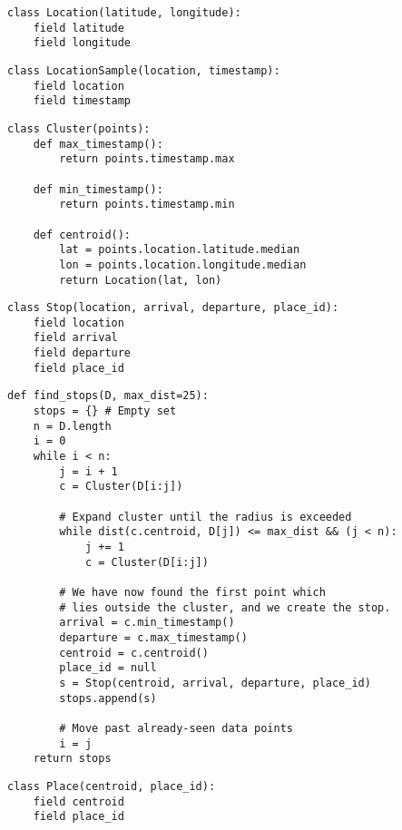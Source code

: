 
\begin{verbatim}
class Location(latitude, longitude):
    field latitude
    field longitude
\end{verbatim}

\begin{verbatim}
class LocationSample(location, timestamp):
    field location
    field timestamp
\end{verbatim}


\begin{verbatim}
class Cluster(points):
    def max_timestamp():
        return points.timestamp.max
        
    def min_timestamp():
        return points.timestamp.min
        
    def centroid():
        lat = points.location.latitude.median
        lon = points.location.longitude.median
        return Location(lat, lon)
\end{verbatim}

\begin{verbatim}
class Stop(location, arrival, departure, place_id):
    field location
    field arrival
    field departure
    field place_id
\end{verbatim}

\begin{verbatim}
def find_stops(D, max_dist=25):
    stops = {} # Empty set
    n = D.length
    i = 0
    while i < n:
        j = i + 1
        c = Cluster(D[i:j])
        
        # Expand cluster until the radius is exceeded
        while dist(c.centroid, D[j]) <= max_dist && (j < n):
            j += 1
            c = Cluster(D[i:j])
        
        # We have now found the first point which 
        # lies outside the cluster, and we create the stop.
        arrival = c.min_timestamp()
        departure = c.max_timestamp()
        centroid = c.centroid()
        place_id = null
        s = Stop(centroid, arrival, departure, place_id) 
        stops.append(s)
        
        # Move past already-seen data points
        i = j
    return stops
\end{verbatim}

\begin{verbatim}
class Place(centroid, place_id):
    field centroid
    field place_id
\end{verbatim}

